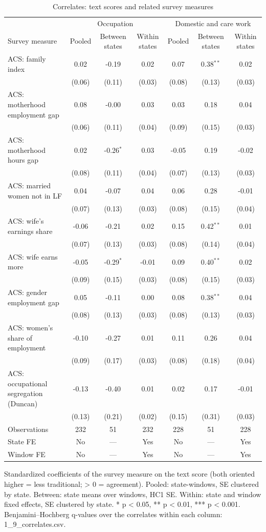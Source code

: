 \begin{table}[ht]\centering\small
\caption{Correlates: text scores and related survey measures}
\begin{tabular}{lcccccc}
\toprule
 & \multicolumn{3}{c}{Occupation} & \multicolumn{3}{c}{Domestic and care work} \\
Survey measure & Pooled & Between states & Within states & Pooled & Between states & Within states \\
\midrule
ACS: family index & 0.02 & -0.19 & 0.02 & 0.07 & 0.38$^{**}$ & 0.02 \\
 & (0.06) & (0.11) & (0.03) & (0.08) & (0.13) & (0.03) \\
ACS: motherhood employment gap & 0.08 & -0.00 & 0.03 & 0.03 & 0.18 & 0.04 \\
 & (0.06) & (0.11) & (0.04) & (0.09) & (0.15) & (0.03) \\
ACS: motherhood hours gap & 0.02 & -0.26$^{*}$ & 0.03 & -0.05 & 0.19 & -0.02 \\
 & (0.08) & (0.11) & (0.04) & (0.07) & (0.13) & (0.03) \\
ACS: married women not in LF & 0.04 & -0.07 & 0.04 & 0.06 & 0.28 & -0.01 \\
 & (0.07) & (0.13) & (0.03) & (0.08) & (0.15) & (0.04) \\
ACS: wife's earnings share & -0.06 & -0.21 & 0.02 & 0.15 & 0.42$^{**}$ & 0.01 \\
 & (0.07) & (0.13) & (0.03) & (0.08) & (0.14) & (0.04) \\
ACS: wife earns more & -0.05 & -0.29$^{*}$ & -0.01 & 0.09 & 0.40$^{**}$ & 0.02 \\
 & (0.09) & (0.15) & (0.03) & (0.08) & (0.15) & (0.03) \\
ACS: gender employment gap & 0.05 & -0.11 & 0.00 & 0.08 & 0.38$^{**}$ & 0.04 \\
 & (0.08) & (0.13) & (0.03) & (0.08) & (0.13) & (0.03) \\
ACS: women's share of employment & -0.10 & -0.27 & 0.01 & 0.11 & 0.26 & 0.04 \\
 & (0.09) & (0.17) & (0.03) & (0.08) & (0.18) & (0.04) \\
ACS: occupational segregation (Duncan) & -0.13 & -0.40 & 0.01 & 0.02 & 0.17 & -0.01 \\
 & (0.13) & (0.21) & (0.02) & (0.15) & (0.31) & (0.03) \\
\midrule
Observations & 232 & 51 & 232 & 228 & 51 & 228 \\
State FE & No & — & Yes & No & — & Yes \\
Window FE & No & — & Yes & No & — & Yes \\
\bottomrule
\end{tabular}
\par\footnotesize Standardized coefficients of the survey measure on the text score (both oriented higher = less traditional; > 0 = agreement). Pooled: state-windows, SE clustered by state. Between: state means over windows, HC1 SE. Within: state and window fixed effects, SE clustered by state. * p < 0.05, ** p < 0.01, *** p < 0.001. Benjamini–Hochberg q-values over the correlates within each column: 1_9_correlates.csv.
\end{table}